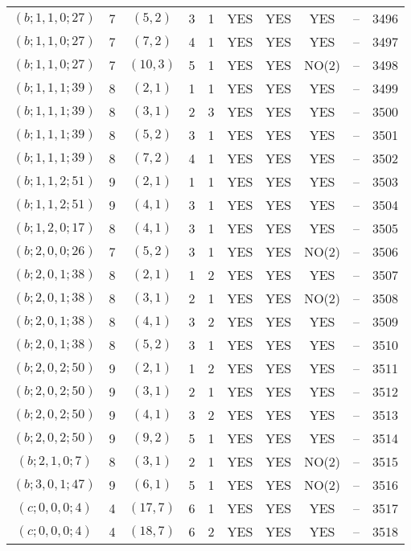 \begin{longtable}{|c|c|c|c|c|c|c|c|c|c|}
$(b; 1, 1, 0; 27)$ & 7 & $(5, 2)$ & 3 & 1 & YES & YES & YES & -- & 3496\\
$(b; 1, 1, 0; 27)$ & 7 & $(7, 2)$ & 4 & 1 & YES & YES & YES & -- & 3497\\
$(b; 1, 1, 0; 27)$ & 7 & $(10, 3)$ & 5 & 1 & YES & YES & NO(2) & -- & 3498\\
$(b; 1, 1, 1; 39)$ & 8 & $(2, 1)$ & 1 & 1 & YES & YES & YES & -- & 3499\\
$(b; 1, 1, 1; 39)$ & 8 & $(3, 1)$ & 2 & 3 & YES & YES & YES & -- & 3500\\
$(b; 1, 1, 1; 39)$ & 8 & $(5, 2)$ & 3 & 1 & YES & YES & YES & -- & 3501\\
$(b; 1, 1, 1; 39)$ & 8 & $(7, 2)$ & 4 & 1 & YES & YES & YES & -- & 3502\\
$(b; 1, 1, 2; 51)$ & 9 & $(2, 1)$ & 1 & 1 & YES & YES & YES & -- & 3503\\
$(b; 1, 1, 2; 51)$ & 9 & $(4, 1)$ & 3 & 1 & YES & YES & YES & -- & 3504\\
$(b; 1, 2, 0; 17)$ & 8 & $(4, 1)$ & 3 & 1 & YES & YES & YES & -- & 3505\\
$(b; 2, 0, 0; 26)$ & 7 & $(5, 2)$ & 3 & 1 & YES & YES & NO(2) & -- & 3506\\
$(b; 2, 0, 1; 38)$ & 8 & $(2, 1)$ & 1 & 2 & YES & YES & YES & -- & 3507\\
$(b; 2, 0, 1; 38)$ & 8 & $(3, 1)$ & 2 & 1 & YES & YES & NO(2) & -- & 3508\\
$(b; 2, 0, 1; 38)$ & 8 & $(4, 1)$ & 3 & 2 & YES & YES & YES & -- & 3509\\
$(b; 2, 0, 1; 38)$ & 8 & $(5, 2)$ & 3 & 1 & YES & YES & YES & -- & 3510\\
$(b; 2, 0, 2; 50)$ & 9 & $(2, 1)$ & 1 & 2 & YES & YES & YES & -- & 3511\\
$(b; 2, 0, 2; 50)$ & 9 & $(3, 1)$ & 2 & 1 & YES & YES & YES & -- & 3512\\
$(b; 2, 0, 2; 50)$ & 9 & $(4, 1)$ & 3 & 2 & YES & YES & YES & -- & 3513\\
$(b; 2, 0, 2; 50)$ & 9 & $(9, 2)$ & 5 & 1 & YES & YES & YES & -- & 3514\\
$(b; 2, 1, 0; 7)$ & 8 & $(3, 1)$ & 2 & 1 & YES & YES & NO(2) & -- & 3515\\
$(b; 3, 0, 1; 47)$ & 9 & $(6, 1)$ & 5 & 1 & YES & YES & NO(2) & -- & 3516\\
$(c; 0, 0, 0; 4)$ & 4 & $(17, 7)$ & 6 & 1 & YES & YES & YES & -- & 3517\\
$(c; 0, 0, 0; 4)$ & 4 & $(18, 7)$ & 6 & 2 & YES & YES & YES & -- & 3518\\

\end{longtable}
